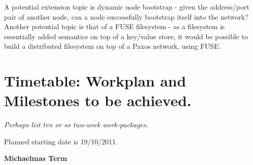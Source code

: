 A potential extension topic is dynamic node bootstrap - given the address/port pair of another
node, can a node successfully bootstrap itself into the network? Another potential topic is that
of a FUSE filesystem - as a filesystem is essentially added semantics on top of a key/value store,
it would be possible to build a distributed filesystem on top of a Paxos network, using FUSE.

\section*{Timetable: Workplan and Milestones to be achieved.}

{\em Perhaps list ten or so two-week work-packages.}

Planned starting date is 19/10/2011.

{\bf Michaelmas Term}
